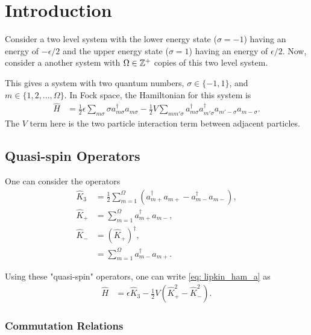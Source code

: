 \documentclass[
a4paper,
10pt,
twoside,
]{article}
\begin{document}
{}
\maketitle
\startmcols

\section{Introduction}\label{sec: I}

Consider a two level system with the lower energy state ($\sigma = -1$) having an energy of $-\epsilon/2$ and the upper energy state ($\sigma=1$) having an energy of $\epsilon/2$.
Now, consider a another system with $\Omega \in \mathbb{Z}^+$ copies of this two level system.

This gives a system with two quantum numbers, $\sigma \in \{-1,1\}$, and $m \in \{1,2,\dots,\Omega\}$.
In Fock space, the Hamiltonian for this system is
\begin{align}
	\hat{H} &= \frac{1}{2} \epsilon \sum_{m\sigma}\sigma a_{m\sigma}^\dagger a_{m\sigma}- \frac{1}{2}V\sum_{mm'\sigma}a_{m\sigma}^\dagger a_{m'\sigma}^\dagger a_{m'-\sigma}a_{m-\sigma}.
	\label{eq: lipkin_ham_a}
\end{align}
The $V$ term here is the two particle interaction term between adjacent particles.

\subsection{Quasi-spin Operators} \label{ssec: IA}

One can consider the operators
\begin{align}
	\hat{K}_3 &= \frac{1}{2} \sum_{m=1}^\Omega (a_{m+}^\dagger a_{m+}-a_{m-}^\dagger a_{m-}),\\
	\hat{K}_+ &= \sum_{m=1}^\Omega a_{m+}^\dagger a_{m-},\\
	\hat{K}_- &= (\hat{K}_+)^\dagger,\\
		&= \sum_{m=1}^\Omega a_{m-}^\dagger a_{m+}.
\end{align}

Using these "quasi-spin" operators, one can write \ref{eq: lipkin_ham_a} as
\begin{align}
	\hat{H} &= \epsilon \hat{K}_3 - \frac{1}{2}V (\hat{K}_+^2-\hat{K}_-^2).
	\label{eq: lipkin_ham_k}
\end{align}


\subsubsection{Commutation Relations} \label{sssec: IA1}
\end{document}
